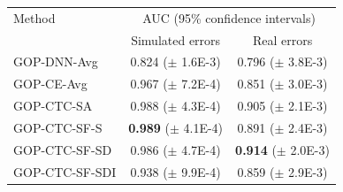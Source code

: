 \begin{tabular}{ lcc }
 \hline\hline
 Method & \multicolumn{2}{c}{AUC (95\% confidence intervals)} \\
 & Simulated errors & Real errors \\
 \hline
 GOP-DNN-Avg~\cite{cao23_interspeech} & 0.824 ($\pm$ 1.6E-3) & 0.796 ($\pm$ 3.8E-3) \\
 GOP-CE-Avg & 0.967 ($\pm$ 7.2E-4) & 0.851 ($\pm$ 3.0E-3) \\
 GOP-CTC-SA & 0.988 ($\pm$ 4.3E-4) & 0.905 ($\pm$ 2.1E-3) \\
 GOP-CTC-SF-S & \textbf{0.989} ($\pm$ 4.1E-4) & 0.891 ($\pm$ 2.4E-3) \\
 GOP-CTC-SF-SD & 0.986 ($\pm$ 4.7E-4) &\textbf{0.914} ($\pm$ 2.0E-3) \\
 GOP-CTC-SF-SDI & 0.938 ($\pm$ 9.9E-4) & 0.859 ($\pm$ 2.9E-3) \\
 \hline\hline
\end{tabular}
